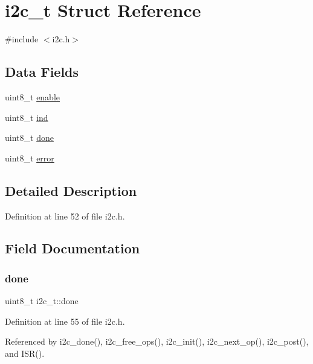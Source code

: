 \hypertarget{structi2c__t}{}\section{i2c\+\_\+t Struct Reference}
\label{structi2c__t}


{\ttfamily \#include $<$i2c.\+h$>$}

\subsection*{Data Fields}
\begin{DoxyCompactItemize}
\item 
uint8\+\_\+t \hyperlink{structi2c__t_a4f93d346cc47b87d440b938474cc067c}{enable}
\item 
uint8\+\_\+t \hyperlink{structi2c__t_a3d1592ac8ecc86a8f71fe593b29488b2}{ind}
\item 
uint8\+\_\+t \hyperlink{structi2c__t_af3d87db9ab7b8e36414e02664577ba65}{done}
\item 
uint8\+\_\+t \hyperlink{structi2c__t_a8d7082575277088bb81918df8d3990f8}{error}
\end{DoxyCompactItemize}


\subsection{Detailed Description}


Definition at line 52 of file i2c.\+h.



\subsection{Field Documentation}
\mbox{\label{structi2c__t_af3d87db9ab7b8e36414e02664577ba65}} 
\subsubsection{\texorpdfstring{done}{done}}
{\footnotesize\ttfamily uint8\+\_\+t i2c\+\_\+t\+::done}



Definition at line 55 of file i2c.\+h.



Referenced by i2c\+\_\+done(), i2c\+\_\+free\+\_\+ops(), i2c\+\_\+init(), i2c\+\_\+next\+\_\+op(), i2c\+\_\+post(), and I\+S\+R().

